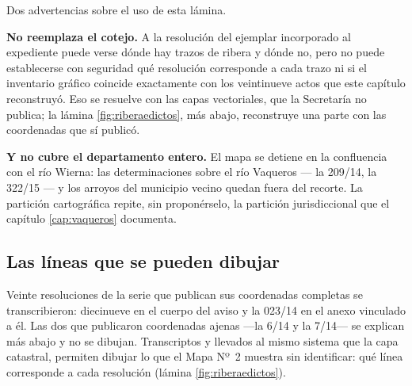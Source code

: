 \begin{cautela}
Dos advertencias sobre el uso de esta lámina.

\textbf{No reemplaza el cotejo.} A la resolución del ejemplar incorporado al expediente puede
verse dónde hay trazos de ribera y dónde no, pero no puede establecerse con seguridad qué
resolución corresponde a cada trazo ni si el inventario gráfico coincide exactamente con los
veintinueve actos que este capítulo reconstruyó. Eso se resuelve con las capas vectoriales, que
la Secretaría no publica; la lámina \ref{fig:riberaedictos}, más abajo, reconstruye una parte
con las coordenadas que sí publicó.

\textbf{Y no cubre el departamento entero.} El mapa se detiene en la confluencia con el río
Wierna: las determinaciones sobre el río Vaqueros --- la 209/14, la 322/15 --- y los arroyos
del municipio vecino quedan fuera del recorte. La partición cartográfica repite, sin
proponérselo, la partición jurisdiccional que el capítulo \ref{cap:vaqueros} documenta.
\end{cautela}

\subsection*{Las líneas que se pueden dibujar}

Veinte resoluciones de la serie que publican sus coordenadas completas se transcribieron: diecinueve en el cuerpo del aviso y la 023/14 en el anexo vinculado a él. Las dos que publicaron coordenadas ajenas ---la 6/14 y la 7/14--- se explican más abajo y no se dibujan. Transcriptos y llevados al mismo sistema que la capa catastral, permiten dibujar lo que el Mapa Nº~2 muestra sin identificar: qué línea corresponde a cada resolución (lámina \ref{fig:riberaedictos}).

